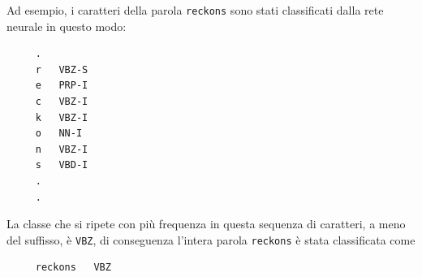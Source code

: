 Ad esempio, i caratteri della parola \texttt{reckons} sono stati classificati
dalla rete neurale in questo modo:

\begin{center}
  \begin{minipage}{5cm}
    \begin{verbatim}
     .
     r   VBZ-S
     e   PRP-I
     c   VBZ-I
     k   VBZ-I
     o   NN-I
     n   VBZ-I
     s   VBD-I
     .
     .
    \end{verbatim}
  \end{minipage}
\end{center}

La classe che si ripete con pi\`u frequenza in questa sequenza di caratteri, a
meno del suffisso, \`e \texttt{VBZ}, di conseguenza l'intera parola \texttt{reckons}
\`e stata classificata come

\begin{center}
  \begin{minipage}{5cm}
    \begin{verbatim}
     reckons   VBZ
    \end{verbatim}
  \end{minipage}
\end{center}
